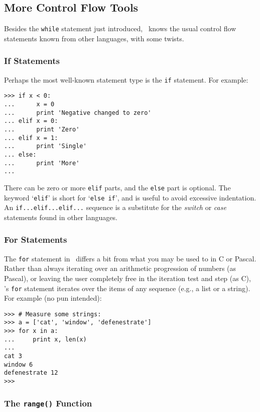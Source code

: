 \subsection{More Control Flow Tools}

Besides the {\tt while} statement just introduced, \Python\ knows the
usual control flow statements known from other languages, with some
twists.

\subsubsection{If Statements}

Perhaps the most well-known statement type is the {\tt if} statement.
For example:
\bcode\begin{verbatim}
>>> if x < 0:
...      x = 0
...      print 'Negative changed to zero'
... elif x = 0:
...      print 'Zero'
... elif x = 1:
...      print 'Single'
... else:
...      print 'More'
...
\end{verbatim}\ecode
There can be zero or more {\tt elif} parts, and the {\tt else} part is
optional.
The keyword `{\tt elif}' is short for `{\tt else if}', and is useful to
avoid excessive indentation.
An {\tt if...elif...elif...} sequence is a substitute for the
{\em switch} or {\em case} statements found in other languages.

\subsubsection{For Statements}

The {\tt for} statement in \Python\ differs a bit from what you may be
used to in C or Pascal.
Rather than always iterating over an arithmetic progression of numbers
(as Pascal), or leaving the user completely free in the iteration test
and step (as C), \Python's {\tt for} statement iterates over the items
of any sequence (e.g., a list or a string).
For example (no pun intended):
\bcode\begin{verbatim}
>>> # Measure some strings:
>>> a = ['cat', 'window', 'defenestrate']
>>> for x in a:
...     print x, len(x)
...
cat 3
window 6
defenestrate 12
>>>
\end{verbatim}\ecode

\subsubsection{The {\tt range()} Function}


